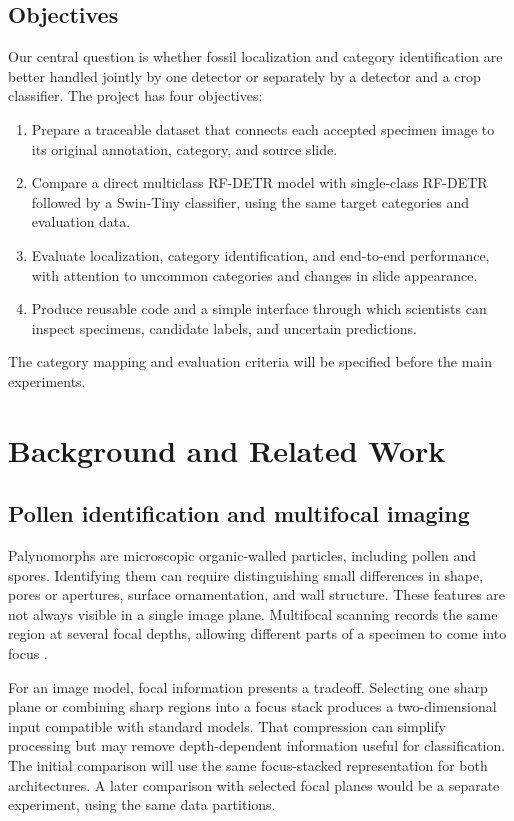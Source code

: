\documentclass[conference,letterpaper]{IEEEtran}
\begin{document}
\subsection{Objectives}
Our central question is whether fossil localization and category identification are better handled jointly by one detector or separately by a detector and a crop classifier. The project has four objectives:
\begin{enumerate}
\item Prepare a traceable dataset that connects each accepted specimen image to its original annotation, category, and source slide.
\item Compare a direct multiclass RF-DETR model with single-class RF-DETR followed by a Swin-Tiny classifier, using the same target categories and evaluation data.
\item Evaluate localization, category identification, and end-to-end performance, with attention to uncommon categories and changes in slide appearance.
\item Produce reusable code and a simple interface through which scientists can inspect specimens, candidate labels, and uncertain predictions.
\end{enumerate}
The category mapping and evaluation criteria will be specified before the main experiments.

\section{Background and Related Work}
\subsection{Pollen identification and multifocal imaging}
Palynomorphs are microscopic organic-walled particles, including pollen and spores. Identifying them can require distinguishing small differences in shape, pores or apertures, surface ornamentation, and wall structure. These features are not always visible in a single image plane. Multifocal scanning records the same region at several focal depths, allowing different parts of a specimen to come into focus \cite{shaikh2026,punyasena2022}.

For an image model, focal information presents a tradeoff. Selecting one sharp plane or combining sharp regions into a focus stack produces a two-dimensional input compatible with standard models. That compression can simplify processing but may remove depth-dependent information useful for classification. The initial comparison will use the same focus-stacked representation for both architectures. A later comparison with selected focal planes would be a separate experiment, using the same data partitions.
\end{document}
